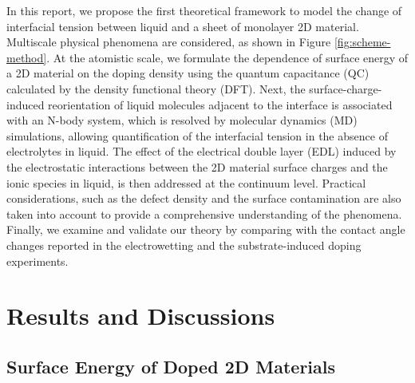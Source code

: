 \documentclass[journal=jacsat,manuscript=article,email=true,hyperref=true,keywords=true]{achemso}
\begin{document}
In this report, we propose the first theoretical framework to model
the change of interfacial tension between liquid and a sheet of
monolayer 2D material. Multiscale physical phenomena are considered,
as shown in Figure \ref{fig:scheme-method}. At the atomistic scale, we
formulate the dependence of surface energy of a 2D material on the
doping density using the quantum capacitance (QC) calculated by the
density functional theory (DFT). Next, the surface-charge-induced
reorientation of liquid molecules adjacent to the interface is
associated with an N-body system, which is resolved by molecular
dynamics (MD) simulations, allowing quantification of the interfacial
tension in the absence of electrolytes in liquid. The effect of the
electrical double layer (EDL) induced by the electrostatic
interactions between the 2D material surface charges and the ionic
species in liquid, is then addressed at the continuum level. Practical
considerations, such as the defect density and the surface
contamination are also taken into account to provide a comprehensive
understanding of the phenomena. Finally, we examine and validate our
theory by comparing with the contact angle changes reported in the
electrowetting and the substrate-induced doping experiments.

\section{Results and Discussions}
\label{sec:orgc095477}

\subsection{Surface Energy of Doped 2D Materials}
\label{sec:org28f87f6}
\end{document}
